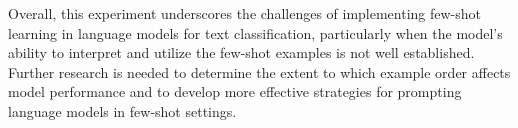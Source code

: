 \documentclass{article}
\begin{document}
Overall, this experiment underscores the challenges of implementing few-shot learning in language models for text classification, particularly when the model's ability to interpret and utilize the few-shot examples is not well established. Further research is needed to determine the extent to which example order affects model performance and to develop more effective strategies for prompting language models in few-shot settings.
\end{document}

